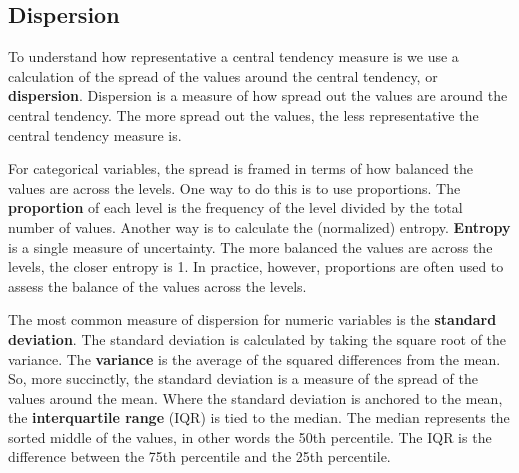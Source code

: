 \documentclass[
  letterpaper,
  krantz1]{latex/krantz-mod}
\theoremstyle{definition}
\theoremstyle{definition}
\theoremstyle{remark}
\begin{document}
\subsection{Dispersion}\label{dispersion}

To understand how representative a central tendency measure is we use a
calculation of the spread of the values around the central tendency, or
\textbf{dispersion}. Dispersion is a measure of how
spread out the values are around the central tendency. The more spread
out the values, the less representative the central tendency measure is.

For categorical variables, the spread is framed in terms of how balanced
the values are across the levels. One way to do this is to use
proportions. The \textbf{proportion} of each level is
the frequency of the level divided by the total number of values.
Another way is to calculate the (normalized) entropy.
\textbf{Entropy} is a single measure of uncertainty. The
more balanced the values are across the levels, the closer entropy is 1.
In practice, however, proportions are often used to assess the balance
of the values across the levels.

The most common measure of dispersion for numeric variables is the
\textbf{standard deviation}. The standard
deviation is calculated by taking the square
root of the variance. The \textbf{variance} is the average of the
squared differences from the mean. So, more succinctly, the standard
deviation is a measure of the spread of the values around the mean.
Where the standard deviation is anchored to the mean, the
\textbf{interquartile range} (IQR) is
tied to the median. The median represents the sorted middle of the
values, in other words the 50th percentile. The IQR is the difference
between the 75th percentile and the 25th percentile.
\end{document}
